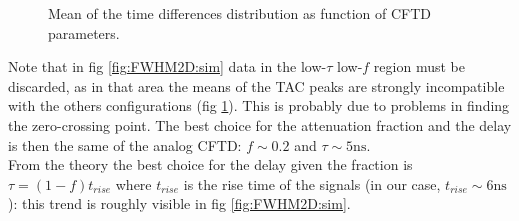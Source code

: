 \documentclass[11pt,a4 paper]{article}
\begin{document}
\begin{figure}[H]
    \centering
    \caption{Mean of the time differences distribution as function of CFTD parameters.}
    \label{fig:Mean2D:sim}
\end{figure}


Note that in fig \ref{fig:FWHM2D:sim} data in the low-$\tau$ low-$f$ region must be discarded, as in that area the means of the TAC peaks are strongly incompatible with the others configurations (fig \ref{fig:Mean2D:sim}). This is probably due to problems in finding the zero-crossing point. The best choice for the attenuation fraction and the delay is then the same of the analog CFTD: $f \sim 0.2$ and $\tau \sim 5\si{\nano\second}$.\\
From the theory the best choice for the delay given the fraction is $\tau = (1 - f)t_{rise}$ where $t_{rise}$ is the rise time of the signals (in our case, $t_{rise}\sim 6\si{\nano\second}$): this trend is roughly visible in fig \ref{fig:FWHM2D:sim}.

%
\end{document}
